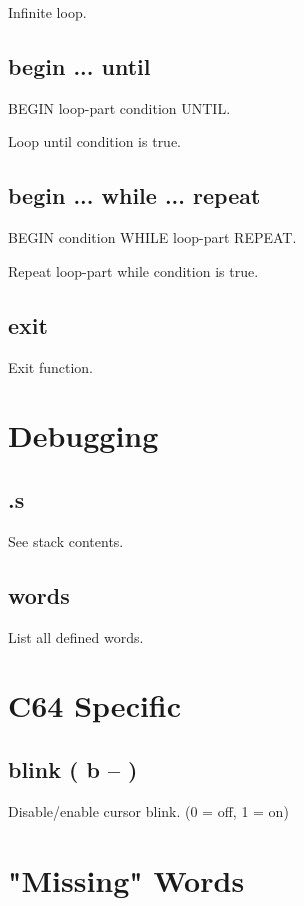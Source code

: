 Infinite loop.

\subsection{begin ... until}

BEGIN loop-part condition UNTIL.

Loop until condition is true.

\subsection{begin ... while ... repeat}

BEGIN condition WHILE loop-part REPEAT.

Repeat loop-part while condition is true.

\subsection{exit}

Exit function.


\section{Debugging}

\subsection{.s}

See stack contents.

\subsection{words}

List all defined words.


\section{C64 Specific}

\subsection{blink ( b -- )}

Disable/enable cursor blink. (0 = off, 1 = on)


\section{"Missing" Words}

